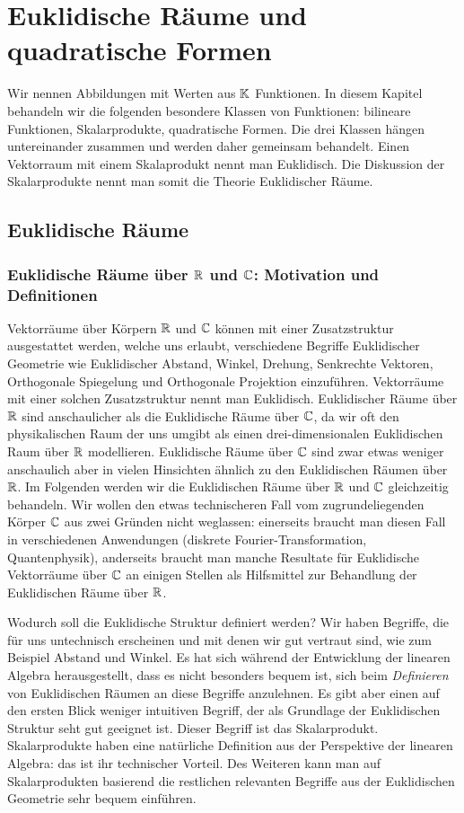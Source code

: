 
\section{Euklidische Räume und quadratische Formen}

Wir nennen Abbildungen mit Werten aus $ \mathbb K $ Funktionen. In diesem Kapitel behandeln wir die folgenden besondere Klassen von Funktionen: bilineare Funktionen, Skalarprodukte, quadratische Formen. Die drei Klassen hängen untereinander zusammen und werden daher gemeinsam behandelt.  Einen Vektorraum mit einem Skalaprodukt nennt man Euklidisch. Die Diskussion der Skalarprodukte nennt man somit die Theorie Euklidischer Räume. 

\subsection{Euklidische Räume}

\subsubsection{Euklidische Räume über $ \mathbb R $ und $ \mathbb C $: Motivation und Definitionen}

Vektorräume über Körpern $\mathbb R$ und $\mathbb C$ können mit einer Zusatzstruktur ausgestattet werden, welche uns erlaubt, verschiedene Begriffe Euklidischer Geometrie wie Euklidischer Abstand, Winkel, Drehung, Senkrechte Vektoren, Orthogonale Spiegelung und Orthogonale Projektion einzuführen. Vektorräume mit einer solchen Zusatzstruktur nennt man Euklidisch. Euklidischer Räume über $\mathbb R$ sind  anschaulicher als die Euklidische Räume über $\mathbb C$, da wir oft den physikalischen Raum der uns umgibt als einen drei-dimensionalen Euklidischen Raum über $\mathbb R$ modellieren. Euklidische Räume über $\mathbb C$ sind zwar etwas weniger anschaulich aber in vielen Hinsichten ähnlich zu den Euklidischen Räumen über $\mathbb R$. Im Folgenden werden wir die Euklidischen Räume über $\mathbb R$ und $\mathbb C$ gleichzeitig behandeln.  Wir wollen den etwas technischeren Fall vom zugrundeliegenden Körper $\mathbb C$ aus zwei Gründen nicht weglassen: einerseits braucht man diesen Fall in verschiedenen Anwendungen (diskrete Fourier-Transformation, Quantenphysik), anderseits braucht man manche Resultate für Euklidische Vektorräume über $\mathbb C$ an einigen Stellen als Hilfsmittel zur Behandlung der Euklidischen Räume über $\mathbb R$. 

Wodurch soll die Euklidische Struktur definiert werden? Wir haben Begriffe, die für uns untechnisch erscheinen und mit denen wir gut vertraut sind, wie zum Beispiel Abstand und Winkel. Es hat sich während der Entwicklung der linearen Algebra herausgestellt, dass es nicht besonders bequem ist, sich beim \emph{Definieren} von Euklidischen Räumen an diese Begriffe anzulehnen. Es gibt aber einen auf den ersten Blick weniger intuitiven Begriff, der als Grundlage der Euklidischen Struktur seht gut geeignet ist. Dieser Begriff ist das Skalarprodukt. Skalarprodukte haben eine natürliche Definition aus der Perspektive der linearen Algebra: das ist ihr technischer Vorteil. Des Weiteren kann man auf Skalarprodukten basierend die restlichen relevanten Begriffe aus der Euklidischen Geometrie sehr bequem einführen. 


